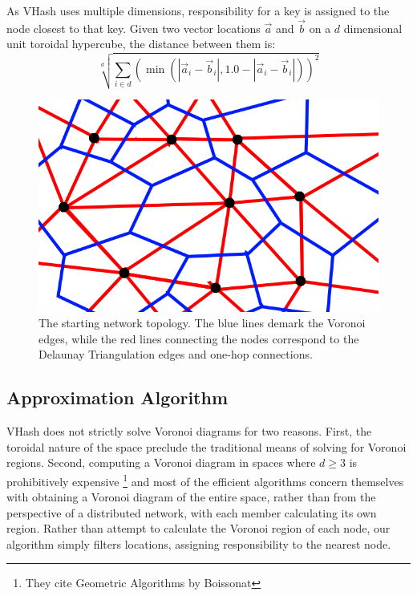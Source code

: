 \documentclass{IEEEtran}
\begin{document}
As VHash uses multiple dimensions, responsibility for a key is assigned to the node closest to that key. Given two vector locations $\vec{a}$ and $\vec{b}$ on a  $d$ dimensional unit toroidal hypercube, the distance between them is:
\[  \sqrt[d]{\sum\limits_{i\in d} (\min(|\vec{a}_i-\vec{b}_i|, 1.0-|\vec{a}_i-\vec{b}_i|))^2}\]





\begin{figure}
    \includegraphics[width=\linewidth]{voronoi-churn2}
    \caption{The starting network topology.  The blue lines demark the Voronoi edges, while the red lines connecting the nodes correspond to the Delaunay Triangulation edges and one-hop connections.}
    \label{churninit}
\end{figure}

\subsection{Approximation Algorithm}

VHash does not strictly solve Voronoi diagrams \cite{voronoi} for two reasons.  First, the toroidal nature of the space preclude the traditional means of solving for Voronoi regions. Second, computing a Voronoi diagram in spaces where $d \geq 3$ is prohibitively expensive \cite{raynet}\footnote{They cite Geometric Algorithms by Boissonat} and most of the efficient algorithms concern themselves with obtaining a Voronoi diagram of the entire space, rather than from the perspective of a distributed network, with each member calculating its own region. Rather than attempt to calculate the Voronoi region of each node, our algorithm simply filters locations, assigning responsibility to the nearest node. 
\end{document}
